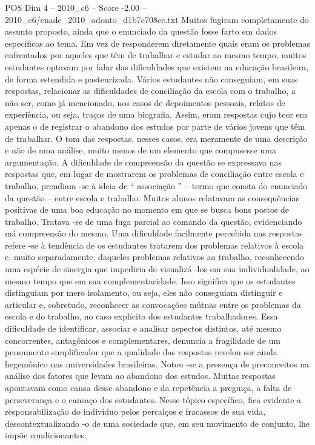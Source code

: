 \begin{textsample}{POS Dim 4 – 2010\_c6 – Score -2.00 – 2010\_c6/enade\_2010\_odonto\_d1b7c708cc.txt}
Muitos fugiram completamente do assunto proposto, ainda que o enunciado da questão fosse farto em dados específicos ao tema.
Em vez de responderem diretamente quais eram os problemas enfrentados por aqueles que têm de trabalhar e estudar ao mesmo tempo, muitos estudantes optavam por falar das dificuldades que existem na educação brasileira, de forma estendida e pasteurizada.
Vários estudantes não conseguiam, em suas respostas, relacionar as dificuldades de conciliação da escola com o trabalho, a não ser, como já mencionado, nos casos de depoimentos pessoais, relatos de experiência, ou seja, traços de uma biografia.
Assim, eram respostas cujo teor era apenas o de registrar o abandono dos estudos por parte de vários jovens que têm de trabalhar.
O tom das respostas, nesses casos, era meramente de uma descrição e não de uma análise, muito menos de um elemento que compusesse uma argumentação.
A dificuldade de compreensão da questão se expressava nas respostas que, em lugar de mostrarem os problemas de conciliação entre escola e trabalho, prendiam -se à ideia de “ associação ” – termo que consta do enunciado da questão – entre escola e trabalho.
Muitos alunos relatavam as consequências positivas de uma boa educação no momento em que se busca bons postos de trabalho.
Tratava -se de uma fuga parcial ao comando da questão, evidenciando má compreensão do mesmo.
Uma dificuldade facilmente percebida nas respostas refere -se à tendência de os estudantes tratarem dos problemas relativos à escola e, muito separadamente, daqueles problemas relativos ao trabalho, reconhecendo uma espécie de sinergia que impediria de visualizá -los em sua individualidade, ao mesmo tempo que em sua complementaridade.
Isso significa que os estudantes distinguiam por mero isolamento, ou seja, eles não conseguiam distinguir e articular e, sobretudo, reconhecer as convocações mútuas entre os problemas da escola e do trabalho, no caso explícito dos estudantes trabalhadores.
Essa dificuldade de identificar, associar e analisar aspectos distintos, até mesmo concorrentes, antagônicos e complementares, denuncia a fragilidade de um pensamento simplificador que a qualidade das respostas revelou ser ainda hegemônico nas universidades brasileiras.
Notou -se a presença de preconceitos na análise dos fatores que levam ao abandono dos estudos.
Muitas respostas apontavam como causa desse abandono e da repetência a preguiça, a falta de perseverança e o cansaço dos estudantes.
Nesse tópico específico, fica evidente a responsabilização do indivíduo pelos percalços e fracassos de sua vida, descontextualizando -o de uma sociedade que, em seu movimento de conjunto, lhe impõe condicionantes.

\end{textsample}
